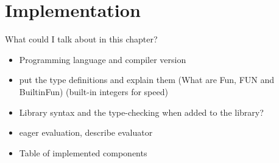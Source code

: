 \chapter{Implementation} \label{implementation}

What could I talk about in this chapter?
\begin{itemize}
\item Programming language and compiler version
\item put the type definitions and explain them (What are Fun, FUN and BuiltinFun) (built-in integers for speed)
\item Library syntax and the type-checking when added to the library?
\item eager evaluation, describe evaluator
\item Table of implemented components
\end{itemize}



